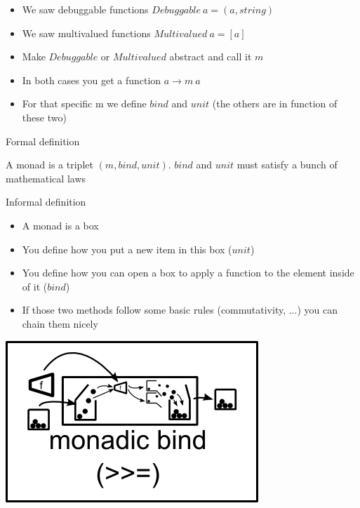 \begin{frame}[fragile]{}
    \begin{block}{}
        \begin{itemize}
            \item We saw debuggable functions $Debuggable \: a = (a, string)$
            \item We saw multivalued functions $Multivalued \: a = [a]$
            \item Make $Debuggable$ or $Multivalued$ abstract and call it $m$
            \item In both cases you get a function $a \rightarrow m \: a$
            \item For that specific m we define $bind$ and $unit$ (the others are in function of these two)
        \end{itemize}
    \end{block}
\end{frame}

\begin{frame}[fragile]{Formal definition}
    \begin{block}{}
        A monad is a triplet $(m, bind, unit)$. $bind$ and $unit$ must satisfy a bunch of mathematical laws
    \end{block}
\end{frame}

\begin{frame}[fragile]{Informal definition}
    \begin{block}{}
        \begin{itemize}
            \item A monad is a box
            \item You define how you put a new item in this box ($unit$)
            \item You define how you can open a box to apply a function to the element inside of it ($bind$)
            \item If those two methods follow some basic rules (commutativity, ...) you can chain them nicely
        \end{itemize}
        \begin{center}
            \includegraphics[scale=0.25]{images/monadic-bind}
        \end{center}
    \end{block}
\end{frame}

